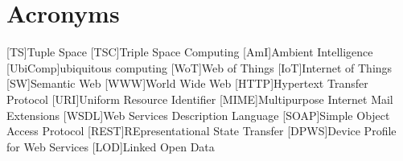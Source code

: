 


\chapter*{Acronyms}

\begin{acronym}
  [TS]{Tuple Space}
  [TSC]{Triple Space Computing}
  [AmI]{Ambient Intelligence}
  [UbiComp]{ubiquitous computing}
  [WoT]{Web of Things}
  [IoT]{Internet of Things}
  [SW]{Semantic Web}
  [WWW]{World Wide Web} %
  [HTTP]{Hypertext Transfer Protocol}
  [URI]{Uniform Resource Identifier}
  [MIME]{Multipurpose Internet Mail Extensions}
  [WSDL]{Web Services Description Language}
  [SOAP]{Simple Object Access Protocol}
  [REST]{REpresentational State Transfer} %
  [DPWS]{Device Profile for Web Services}
  [LOD]{Linked Open Data}
\end{acronym}

